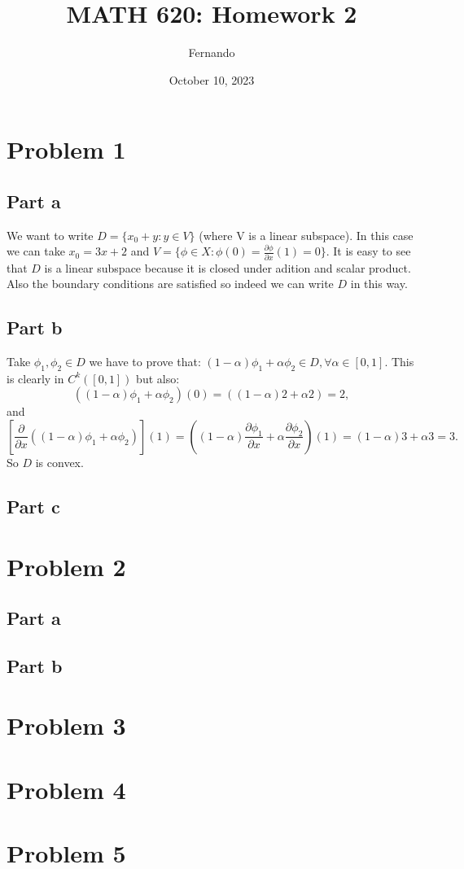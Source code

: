 \documentclass{article}
\title{MATH 620: Homework 2}
\author{Fernando}
\date{October 10, 2023}
\begin{document}
\maketitle
\section{Problem 1}
\subsection{Part a}
We want to write $D=\{x_0+y: y\in V\}$ (where V is a linear subspace).
In this case we can take $x_0=3x+2$ and $V=\{\phi\in X:
\phi(0)=\frac{\partial\phi}{\partial x}(1)=0\}$. It
is easy to see that $D$ is a linear subspace because it is closed under adition
and scalar product. Also the boundary conditions are satisfied so indeed we can
write $D$ in this way.
\subsection{Part b}
Take $\phi_1,\phi_2\in D$ we have to prove that:
$(1-\alpha)\phi_1+\alpha \phi_2 \in D,\forall \alpha \in [0,1]$.
This is clearly in $C^k([0,1])$ but also:
\[
\left((1-\alpha)\phi_1+\alpha\phi_2\right)(0)
=\left((1-\alpha)2+\alpha2\right)=2,
\]
and
\[
\left[\frac{\partial}{\partial x}\left((1-\alpha)\phi_1+\alpha \phi_2\right)\right](1)= 
\left((1-\alpha)\frac{\partial \phi_1}{\partial x}+\alpha\frac{\partial
\phi_2}{\partial x}\right)(1) = (1-\alpha)3+\alpha 3=3.
\]
So $D$ is convex.
\subsection{Part c}
\section{Problem 2}
\subsection{Part a}
\subsection{Part b}
\section{Problem 3}
\section{Problem 4}
\section{Problem 5}
\end{document}
